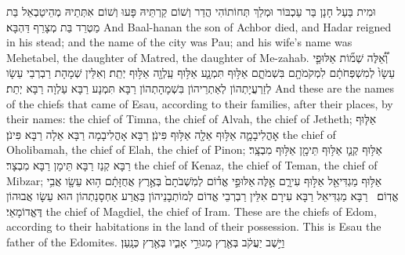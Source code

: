 {וּמִית בַּעַל חָנָן בַּר עַכְבּוֹר וּמְלַךְ תְּחוֹתוֹהִי הֲדַר וְשׁוֹם קַרְתֵּיהּ פָּעוּ וְשׁוֹם אִתְּתֵיהּ מְהֵיטַבְאֵל בַּת מַטְרֵד בַּת מְצָרֵף דַּהְבָּא׃}
{And Baal-hanan the son of Achbor died, and Hadar reigned in his stead; and the name of the city was Pau; and his wife’s name was Mehetabel, the daughter of Matred, the daughter of Me-zahab.}{}
{וְ֠אֵ֠לֶּה שְׁמ֞וֹת אַלּוּפֵ֤י עֵשָׂו֙ לְמִשְׁפְּחֹתָ֔ם לִמְקֹמֹתָ֖ם בִּשְׁמֹתָ֑ם אַלּ֥וּף תִּמְנָ֛ע אַלּ֥וּף עַֽלְוָ֖ה אַלּ֥וּף יְתֵֽת׃}
{וְאִלֵּין שְׁמָהָת רַבְרְבֵי עֵשָׂו לְזַרְעֲיָתְהוֹן לְאַתְרֵיהוֹן בִּשְׁמָהָתְהוֹן רַבָּא תִּמְנָע רַבָּא עַלְוָה רַבָּא יְתֵת׃}
{And these are the names of the chiefs that came of Esau, according to their families, after their places, by their names: the chief of Timna, the chief of Alvah, the chief of Jetheth;}{}
{אַלּ֧וּף אׇהֳלִיבָמָ֛ה אַלּ֥וּף אֵלָ֖ה אַלּ֥וּף פִּינֹֽן׃}
{רַבָּא אָהֳלִיבָמָה רַבָּא אֵלָה רַבָּא פִּינֹן׃}
{the chief of Oholibamah, the chief of Elah, the chief of Pinon;}{}
{אַלּ֥וּף קְנַ֛ז אַלּ֥וּף תֵּימָ֖ן אַלּ֥וּף מִבְצָֽר׃}
{רַבָּא קְנַז רַבָּא תֵּימָן רַבָּא מִבְצָר׃}
{the chief of Kenaz, the chief of Teman, the chief of Mibzar;}{}
{אַלּ֥וּף מַגְדִּיאֵ֖ל אַלּ֣וּף עִירָ֑ם אֵ֣לֶּה \legarmeh  אַלּוּפֵ֣י אֱד֗וֹם לְמֹֽשְׁבֹתָם֙ בְּאֶ֣רֶץ אֲחֻזָּתָ֔ם ה֥וּא עֵשָׂ֖ו אֲבִ֥י אֱדֽוֹם׃ \petucha }
{רַבָּא מַגְדִּיאֵל רַבָּא עִירָם אִלֵּין רַבְרְבֵי אֱדוֹם לְמוֹתְבָנֵיהוֹן בַּאֲרַע אַחְסָנַתְהוֹן הוּא עֵשָׂו אֲבוּהוֹן דֶּאֱדוֹמָאֵי׃}
{the chief of Magdiel, the chief of Iram. These are the chiefs of Edom, according to their habitations in the land of their possession. This is Esau the father of the Edomites.}{}
\newperek
{}
\newseder
{}%
{וַיֵּ֣שֶׁב יַעֲקֹ֔ב בְּאֶ֖רֶץ מְגוּרֵ֣י אָבִ֑יו בְּאֶ֖רֶץ כְּנָֽעַן׃}
